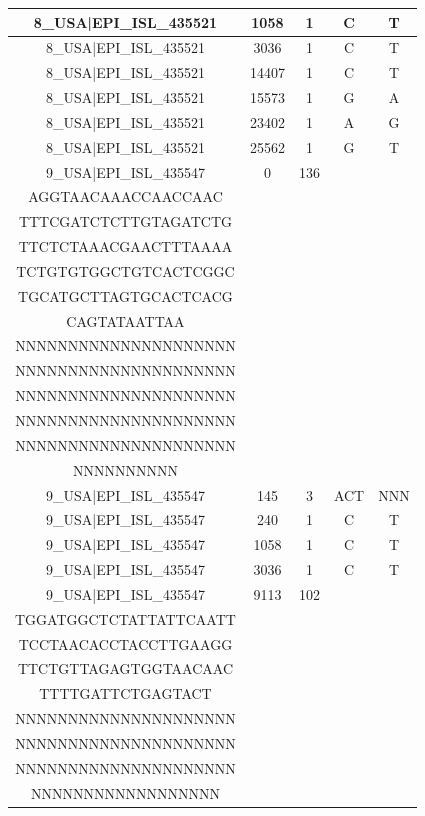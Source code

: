 \documentclass[a4paper,10pt]{article}
\begin{document}
\begin{longtable}{@{}ccccc@{}}
8\_USA|EPI\_ISL\_435521 & 1058 & 1 & C & T \\* \midrule
8\_USA|EPI\_ISL\_435521 & 3036 & 1 & C & T \\* \midrule
8\_USA|EPI\_ISL\_435521 & 14407 & 1 & C & T \\* \midrule
8\_USA|EPI\_ISL\_435521 & 15573 & 1 & G & A \\* \midrule
8\_USA|EPI\_ISL\_435521 & 23402 & 1 & A & G \\* \midrule
8\_USA|EPI\_ISL\_435521 & 25562 & 1 & G & T \\* \midrule
9\_USA|EPI\_ISL\_435547 & 0 & 136 & \begin{tabular}[c]{@{}c@{}}ATTAAAGGTTTATACCTTCCC\\ AGGTAACAAACCAACCAAC\\ TTTCGATCTCTTGTAGATCTG\\ TTCTCTAAACGAACTTTAAAA\\ TCTGTGTGGCTGTCACTCGGC\\ TGCATGCTTAGTGCACTCACG\\ CAGTATAATTAA\end{tabular} & \begin{tabular}[c]{@{}c@{}}NNNNNNNNNNNNNNNNNNNNN\\ NNNNNNNNNNNNNNNNNNNNN\\ NNNNNNNNNNNNNNNNNNNNN\\ NNNNNNNNNNNNNNNNNNNNN\\ NNNNNNNNNNNNNNNNNNNNN\\ NNNNNNNNNNNNNNNNNNNNN\\ NNNNNNNNNN\end{tabular} \\* \midrule
9\_USA|EPI\_ISL\_435547 & 145 & 3 & ACT & NNN \\* \midrule
9\_USA|EPI\_ISL\_435547 & 240 & 1 & C & T \\* \midrule
9\_USA|EPI\_ISL\_435547 & 1058 & 1 & C & T \\* \midrule
9\_USA|EPI\_ISL\_435547 & 3036 & 1 & C & T \\* \midrule
9\_USA|EPI\_ISL\_435547 & 9113 & 102 & \begin{tabular}[c]{@{}c@{}}CTGACACACGTTATGTGCTCA\\ TGGATGGCTCTATTATTCAATT\\ TCCTAACACCTACCTTGAAGG\\ TTCTGTTAGAGTGGTAACAAC\\ TTTTGATTCTGAGTACT\end{tabular} & \begin{tabular}[c]{@{}c@{}}NNNNNNNNNNNNNNNNNNNNN\\ NNNNNNNNNNNNNNNNNNNNN\\ NNNNNNNNNNNNNNNNNNNNN\\ NNNNNNNNNNNNNNNNNNNNN\\ NNNNNNNNNNNNNNNNNN\end{tabular} \\* \midrule

\end{longtable}
\end{document}
